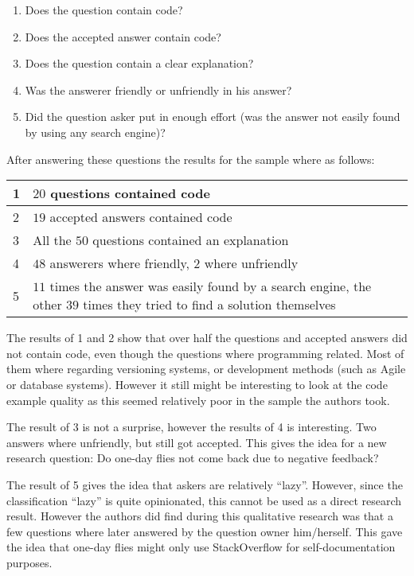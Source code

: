 \documentclass[conference]{IEEEtran}
\begin{document}
\begin{enumerate}
\item Does the question contain code?
\item Does the accepted answer contain code?
\item Does the question contain a clear explanation?
\item Was the answerer friendly or unfriendly in his answer?
\item Did the question asker put in enough effort (was the answer not easily
found by using any search engine)?  
\end{enumerate}

After answering these questions the results for the sample where as follows:
\newline
\newline
\begin{tabular}{ | l | p{8cm} | }
\hline
  1 & $20$ questions contained code \\
\hline
  2 & $19$ accepted answers contained code \\
\hline
  3 & All the $50$ questions contained an explanation \\
\hline
  4 & $48$ answerers where friendly, $2$ where unfriendly \\
\hline
  5 & $11$ times the answer was easily found by a search engine, the other $39$ times they tried to find a solution themselves \\
\hline
\end{tabular}
\newline
\newline

The results of 1 and 2 show that over half the questions and accepted answers
did not contain code, even though the questions where programming related. Most
of them where regarding versioning systems, or development methods (such as
Agile or database systems).  However it still might be interesting to look at
the code example quality as this seemed relatively poor in the sample the
authors took.

The result of 3 is not a surprise, however the results of 4 is interesting. Two
answers where unfriendly, but still got accepted. This gives the idea for a new
research question: Do one-day flies  not come back due to negative feedback? 

The result of 5  gives the idea that askers are relatively ``lazy''. However,
since the classification ``lazy'' is quite opinionated, this cannot be used as
a direct research result. However the authors did find during this qualitative
research was that a few questions where later answered by the question owner
him/herself. This gave the idea that one-day flies might only use StackOverflow
for self-documentation purposes. 
\end{document}
